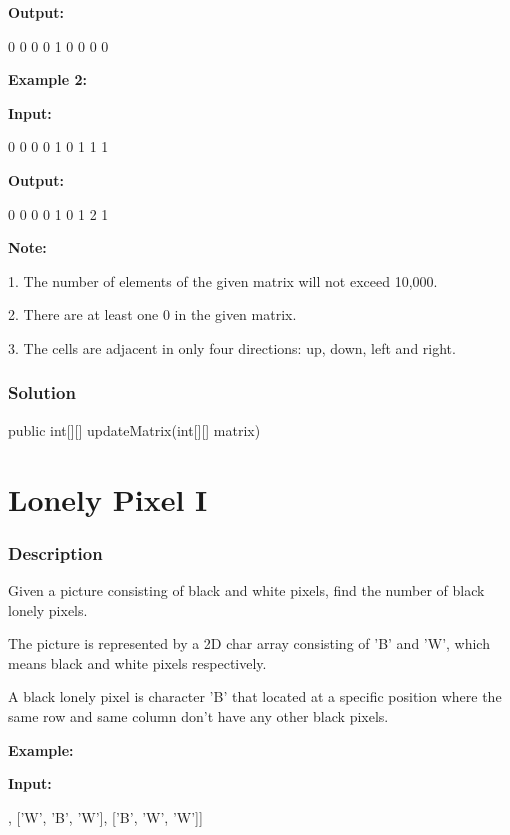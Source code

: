 \textbf{Output:}
\begin{Code}
0 0 0
0 1 0
0 0 0
\end{Code}

\textbf{Example 2:}

\textbf{Input:}
\begin{Code}
0 0 0
0 1 0
1 1 1
\end{Code}

\textbf{Output:}
\begin{Code}
0 0 0
0 1 0
1 2 1
\end{Code}

\textbf{Note:}

1. The number of elements of the given matrix will not exceed 10,000.

2. There are at least one 0 in the given matrix.

3. The cells are adjacent in only four directions: up, down, left and right.

\subsubsection{Solution}

\begin{Code}
public int[][] updateMatrix(int[][] matrix) {

}
\end{Code}

\newpage

\section{Lonely Pixel I} %

\subsubsection{Description}

Given a picture consisting of black and white pixels, find the number of black lonely pixels.

The picture is represented by a 2D char array consisting of 'B' and 'W', which means black and white pixels respectively.

A black lonely pixel is character 'B' that located at a specific position where the same row and same column don't have any other black pixels.

\textbf{Example:}

\textbf{Input:}

\begin{Code}
[['W', 'W', 'B'],
 ['W', 'B', 'W'],
 ['B', 'W', 'W']]
\end{Code}

